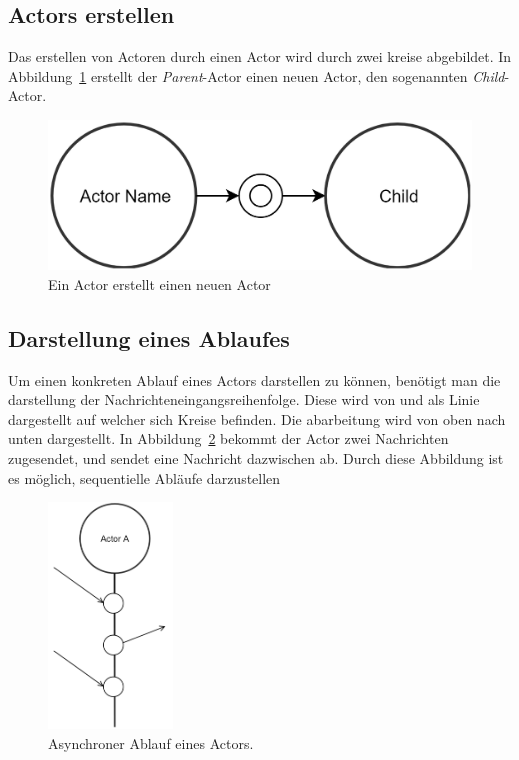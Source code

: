 \subsection{Actors erstellen}
Das erstellen von Actoren durch einen Actor wird durch zwei kreise abgebildet. In Abbildung~\ref{fig:actor:diagram:childActorCreation} erstellt der \textit{Parent}-Actor einen neuen Actor, den sogenannten \textit{Child}-Actor.
\begin{figure}
    \centering
    \includegraphics[width=\linewidth]{gfx/actor/childActorCreation}
    \caption{Ein Actor erstellt einen neuen Actor}
    \label{fig:actor:diagram:childActorCreation}
\end{figure}

\subsection{Darstellung eines Ablaufes}
Um einen konkreten Ablauf eines Actors darstellen zu können, benötigt man die darstellung der Nachrichteneingangsreihenfolge. Diese wird von \cite{kuhn2017reactive} und \cite{Vernon2015ReactiveAkka} als Linie dargestellt auf welcher sich Kreise befinden. Die abarbeitung wird von oben nach unten dargestellt. In Abbildung~\ref{fig:actor:diagram:asynchronMessageReceivment} bekommt der Actor zwei Nachrichten zugesendet, und sendet eine Nachricht dazwischen ab. Durch diese Abbildung ist es möglich, sequentielle Abläufe darzustellen 
\begin{figure}
    \centering
    \includegraphics[height=6cm]{gfx/actor/actorAsynchMessgeFlow}
    \caption{Asynchroner Ablauf eines Actors.}
    \label{fig:actor:diagram:asynchronMessageReceivment}
\end{figure}